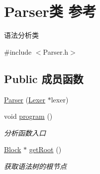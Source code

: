 \hypertarget{class_parser}{}\section{Parser类 参考}
\label{class_parser}


语法分析类  




{\ttfamily \#include $<$Parser.\+h$>$}

\subsection*{Public 成员函数}
\begin{DoxyCompactItemize}
\item 
\hyperlink{class_parser_a25929f4bcec5c5ff010218f001203b73}{Parser} (\hyperlink{class_lexer}{Lexer} $\ast$lexer)
\item 
\mbox{\label{class_parser_af213985eb12738d0dbf7d505a8795ea2}} 
void \hyperlink{class_parser_af213985eb12738d0dbf7d505a8795ea2}{program} ()
\begin{DoxyCompactList}\small\item\em 分析函数入口 \end{DoxyCompactList}\item 
\mbox{\label{class_parser_ad05b2f1f2e9f60a7373961da0588eb5b}} 
\hyperlink{class_block}{Block} $\ast$ \hyperlink{class_parser_ad05b2f1f2e9f60a7373961da0588eb5b}{get\+Root} ()
\begin{DoxyCompactList}\small\item\em 获取语法树的根节点 \end{DoxyCompactList}\end{DoxyCompactItemize}
